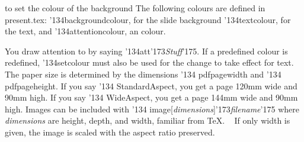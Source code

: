 to set the colour of the background
\NewSlide
The following colours are
defined in {\cf present.tex}:
\vskip5pt
{\cf \char'134backgroundcolour}, for the slide background 
\vskip5pt
{\cf \char'134textcolour}, for the text, and
\vskip5pt
{\cf \char'134attentioncolour}, an  colour. 

You draw attention to  by saying
{\cf\char'134att\char'173}{\it Stuff\/}{\cf\char'175}.
\vskip5pt
If a predefined colour is redefined, {\cf\char'134setcolour}
must also be used for the change to take effect for text. 
\NewSlide
The paper size is determined by the dimensions 
\vskip3pt {\cf\char'134 pdfpagewidth} and
{\cf\char'134 pdfpageheight}. 
\vskip10pt
If you say {\cf\char'134 StandardAspect}, you get a page 120mm wide and 90mm high.
\vskip10pt
If you say {\cf\char'134 WideAspect}, you get a page 144mm wide and 90mm high.
\NewSlide
Images can be included with
\vskip5pt
{\cf\char'134 image[}{\it dimensions}{\cf]\char'173}{\it filename}{\cf\char'175}
\vskip5pt
where {\it dimensions} are {\cf height}, {\cf depth}, and {\cf width}, familiar from \TeX.
\vskip5pt
\hbox{%
}
\vskip5pt
If only {\cf width} is given, the image is scaled with the aspect ratio preserved.

